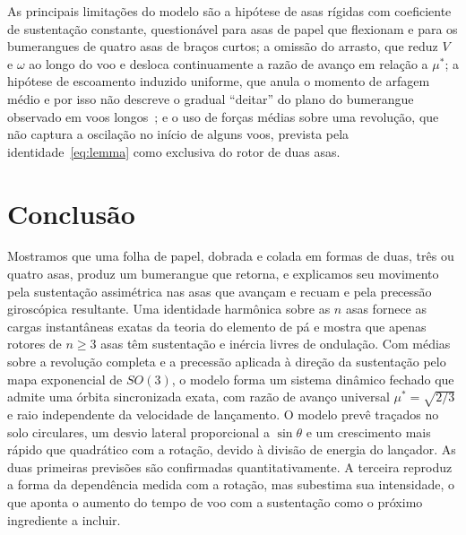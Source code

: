 \documentclass[aps,pre,twocolumn,superscriptaddress,nofootinbib,floatfix]{revtex4-2}
\begin{document}
As principais limitações do modelo são a hipótese de asas rígidas com coeficiente de sustentação constante, questionável para asas de papel que flexionam e para os bumerangues de quatro asas de braços curtos; a omissão do arrasto, que reduz $V$ e $\omega$ ao longo do voo e desloca continuamente a razão de avanço em relação a $\mu^\ast$; a hipótese de escoamento induzido uniforme, que anula o momento de arfagem médio e por isso não descreve o gradual ``deitar'' do plano do bumerangue observado em voos longos~\cite{hess1968}; e o uso de forças médias sobre uma revolução, que não captura a oscilação no início de alguns voos, prevista pela identidade~\eqref{eq:lemma} como exclusiva do rotor de duas asas.

\section{Conclusão}
\label{sec:conclusion}

Mostramos que uma folha de papel, dobrada e colada em formas de duas, três ou quatro asas, produz um bumerangue que retorna, e explicamos seu movimento pela sustentação assimétrica nas asas que avançam e recuam e pela precessão giroscópica resultante. Uma identidade harmônica sobre as $n$ asas fornece as cargas instantâneas exatas da teoria do elemento de pá e mostra que apenas rotores de $n\geq3$ asas têm sustentação e inércia livres de ondulação. Com médias sobre a revolução completa e a precessão aplicada à direção da sustentação pelo mapa exponencial de $SO(3)$, o modelo forma um sistema dinâmico fechado que admite uma órbita sincronizada exata, com razão de avanço universal $\mu^\ast=\sqrt{2/3}$ e raio independente da velocidade de lançamento. O modelo prevê traçados no solo circulares, um desvio lateral proporcional a $\sin\theta$ e um crescimento mais rápido que quadrático com a rotação, devido à divisão de energia do lançador. As duas primeiras previsões são confirmadas quantitativamente. A terceira reproduz a forma da dependência medida com a rotação, mas subestima sua intensidade, o que aponta o aumento do tempo de voo com a sustentação como o próximo ingrediente a incluir.


\end{document}
